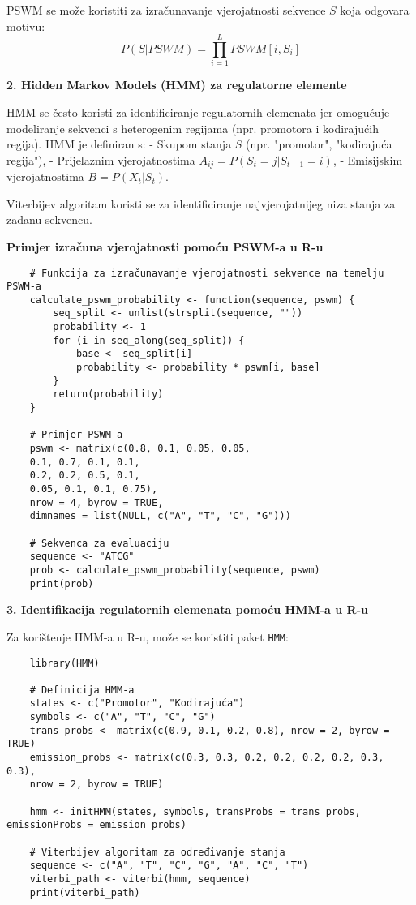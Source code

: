 \documentclass[10pt,a4paper,twoside]{article}
\begin{document}
PSWM se može koristiti za izračunavanje vjerojatnosti sekvence \( S \) koja odgovara motivu:
\[
P(S | PSWM) = \prod_{i=1}^L PSWM[i, S_i]
\]

\textbf{2. Hidden Markov Models (HMM) za regulatorne elemente}  

HMM se često koristi za identificiranje regulatornih elemenata jer omogućuje modeliranje sekvenci s heterogenim regijama (npr. promotora i kodirajućih regija). HMM je definiran s:
- Skupom stanja \( S \) (npr. "promotor", "kodirajuća regija"),
- Prijelaznim vjerojatnostima \( A_{ij} = P(S_t = j | S_{t-1} = i) \),
- Emisijskim vjerojatnostima \( B = P(X_t | S_t) \).

Viterbijev algoritam koristi se za identificiranje najvjerojatnijeg niza stanja za zadanu sekvencu.

\textbf{Primjer izračuna vjerojatnosti pomoću PSWM-a u R-u}  

\begin{verbatim}
	# Funkcija za izračunavanje vjerojatnosti sekvence na temelju PSWM-a
	calculate_pswm_probability <- function(sequence, pswm) {
		seq_split <- unlist(strsplit(sequence, ""))
		probability <- 1
		for (i in seq_along(seq_split)) {
			base <- seq_split[i]
			probability <- probability * pswm[i, base]
		}
		return(probability)
	}
	
	# Primjer PSWM-a
	pswm <- matrix(c(0.8, 0.1, 0.05, 0.05,
	0.1, 0.7, 0.1, 0.1,
	0.2, 0.2, 0.5, 0.1,
	0.05, 0.1, 0.1, 0.75), 
	nrow = 4, byrow = TRUE,
	dimnames = list(NULL, c("A", "T", "C", "G")))
	
	# Sekvenca za evaluaciju
	sequence <- "ATCG"
	prob <- calculate_pswm_probability(sequence, pswm)
	print(prob)
\end{verbatim}

\textbf{3. Identifikacija regulatornih elemenata pomoću HMM-a u R-u}  

Za korištenje HMM-a u R-u, može se koristiti paket \texttt{HMM}:
\begin{verbatim}
	library(HMM)
	
	# Definicija HMM-a
	states <- c("Promotor", "Kodirajuća")
	symbols <- c("A", "T", "C", "G")
	trans_probs <- matrix(c(0.9, 0.1, 0.2, 0.8), nrow = 2, byrow = TRUE)
	emission_probs <- matrix(c(0.3, 0.3, 0.2, 0.2, 0.2, 0.2, 0.3, 0.3), 
	nrow = 2, byrow = TRUE)
	
	hmm <- initHMM(states, symbols, transProbs = trans_probs, emissionProbs = emission_probs)
	
	# Viterbijev algoritam za određivanje stanja
	sequence <- c("A", "T", "C", "G", "A", "C", "T")
	viterbi_path <- viterbi(hmm, sequence)
	print(viterbi_path)
\end{verbatim}
\end{document}
